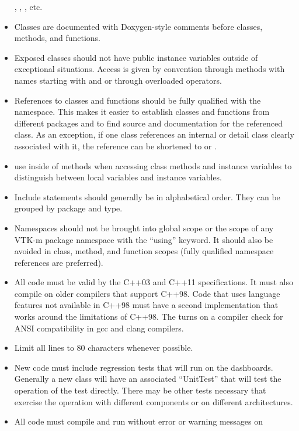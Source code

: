 \begin{itemize}
  , , ,
  etc.
\item Classes are documented with Doxygen-style comments before classes,
  methods, and functions.
\item Exposed classes should not have public instance variables outside of
  exceptional situations. Access is given by convention through methods
  with names starting with  and  or through
  overloaded operators.
\item References to classes and functions should be fully qualified with
  the namespace. This makes it easier to establish classes and functions
  from different packages and to find source and documentation for the
  referenced class. As an exception, if one class references an internal or
  detail class clearly associated with it, the reference can be shortened
  to  or .
\item use  inside of methods when accessing class methods
  and instance variables to distinguish between local variables and
  instance variables.
\item Include statements should generally be in alphabetical order. They
  can be grouped by package and type.
\item Namespaces should not be brought into global scope or the scope of
  any VTK-m package namespace with the ``using'' keyword. It should also be
  avoided in class, method, and function scopes (fully qualified namespace
  references are preferred).
\item All code must be valid by the C++03 and C++11 specifications. It must
  also compile on older compilers that support C++98. Code that uses
  language features not available in C++98 must have a second
  implementation that works around the limitations of C++98. The
   turns on a compiler check for ANSI
  compatibility in gcc and clang compilers.
\item Limit all lines to 80 characters whenever possible.
\item New code must include regression tests that will run on the
  dashboards. Generally a new class will have an associated ``UnitTest''
  that will test the operation of the test directly. There may be other
  tests necessary that exercise the operation with different components or
  on different architectures.
\item All code must compile and run without error or warning messages on

\end{itemize}
